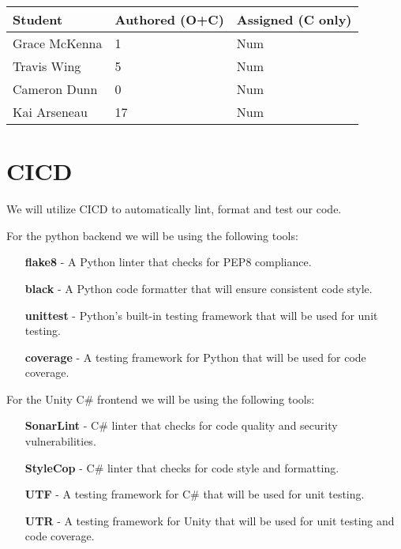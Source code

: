 \documentclass{article}
\begin{document}

\begin{table}[H]
\centering
\begin{tabular}{lll}
\toprule
\textbf{Student} & \textbf{Authored (O+C)} & \textbf{Assigned (C only)}\\
\midrule
Grace McKenna & 1 & Num \\
Travis Wing & 5 & Num \\
Cameron Dunn & 0 & Num \\
Kai Arseneau & 17 & Num \\
\bottomrule
\end{tabular}
\end{table}


\section{CICD}

We will utilize CICD to automatically lint, format and test our code. 

For the python backend we will be using the following tools:
\begin{itemize}
  \item [\textbf{flake8}] - A Python linter that checks for PEP8 compliance.
  \item [\textbf{black}] - A Python code formatter that will ensure consistent code style.
  \item [\textbf{unittest}] - Python's built-in testing framework that will be used for unit testing.
  \item [\textbf{coverage}] - A testing framework for Python that will be used for code coverage.
\end{itemize}

\bigskip
\noindent For the Unity C\# frontend we will be using the following tools:
\begin{itemize}
  \item [\textbf{SonarLint}] - C\# linter that checks for code quality and security vulnerabilities.
  \item [\textbf{StyleCop}] - C\# linter that checks for code style and formatting.
  \item [\textbf{UTF}] - A testing framework for C\# that will be used for unit testing.
  \item [\textbf{UTR}] - A testing framework for Unity that will be used for unit testing and code coverage.
\end{itemize}
\end{document}
